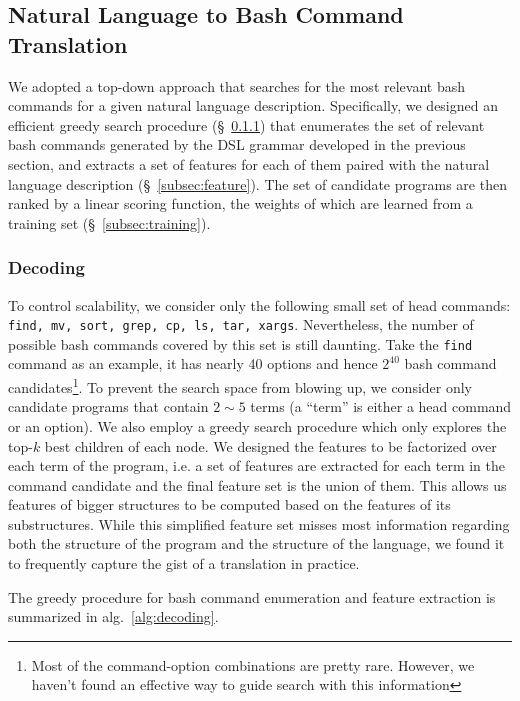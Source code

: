 \subsection{Natural Language to Bash Command Translation}
\label{subsec:parser}

We adopted a top-down approach that searches for the most relevant bash commands for a given natural language description. Specifically, we designed an efficient greedy search procedure (\S~\ref{subsec:decoding}) that enumerates the set of relevant bash commands generated by the DSL grammar developed in the previous section, and extracts a set of features for each of them paired with the natural language description (\S~\ref{subsec:feature}). The set of candidate programs are then ranked by a linear scoring function, the weights of which are learned from a training set (\S~\ref{subsec:training}). 

\subsubsection{Decoding}
\label{subsec:decoding}

To control scalability, we consider only the following small set of head commands: \texttt{find, mv, sort, grep, cp, ls, tar, xargs}. Nevertheless, the number of possible bash commands covered by this set is still daunting. Take the \texttt{find} command as an example, it has nearly 40 options and hence $2^{40}$ bash command candidates\footnote{Most of the command-option combinations are pretty rare. However, we haven't found an effective way to guide search with this information}. To prevent the search space from blowing up, we consider only candidate programs that contain $2\sim 5$ terms (a ``term'' is either a head command or an option). We also employ a greedy search procedure which only explores the top-$k$ best children of each node. We designed the features to be factorized over each term of the program, i.e. a set of features are extracted for each term in the command candidate and the final feature set is the union of them. This allows us features of bigger structures to be computed based on the features of its substructures. While this simplified feature set misses most information regarding both the structure of the program and the structure of the language, we found it to frequently capture the gist of a translation in practice. 

The greedy procedure for bash command enumeration and feature extraction is summarized in alg.~\ref{alg:decoding}.

